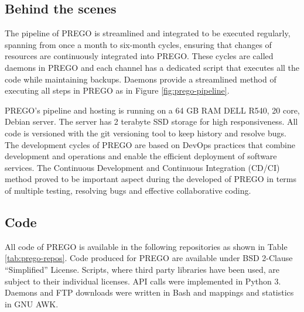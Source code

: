 \subsection{Behind the scenes}
\label{deamons}

The pipeline of PREGO is streamlined and integrated to be executed regularly,
spanning from once a month to six-month cycles, ensuring that changes of resources are
continuously integrated into PREGO. These cycles are called daemons in PREGO and 
each channel has a dedicated script that executes all the code while 
maintaining backups. Daemons provide a streamlined method of executing all steps 
in PREGO as in Figure \ref{fig:prego-pipeline}.

PREGO's pipeline and hosting is running on a 64 GB RAM DELL R540, 20 core, Debian server.
The server has 2 terabyte SSD storage for high responsiveness. 
All code is versioned with the git versioning tool to keep history and 
resolve bugs. The development cycles of PREGO are based on DevOps practices that
combine development and operations and enable the efficient deployment of software services.
The Continuous Development and Continuous Integration (CD/CI) method proved to be
important aspect during the developed of PREGO in terms of multiple testing,
resolving bugs and effective collaborative coding. 



   \subsection{Code} 
   All code of PREGO is available in the following repositories as shown in Table \ref{tab:prego-repos}.
   Code produced for PREGO are available under BSD 2-Clause “Simplified” License.
Scripts, where third party libraries have been used, are subject to their individual licenses.
API calls were implemented in Python 3. Daemons and FTP downloads were written in Bash and 
mappings and statistics in GNU AWK.

